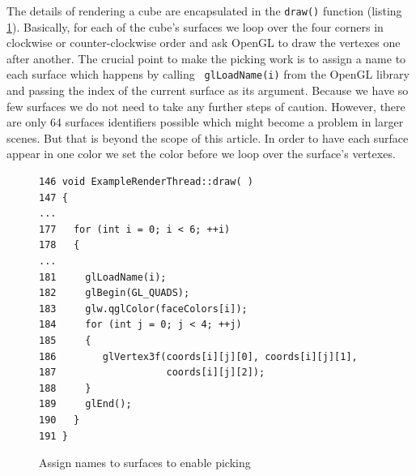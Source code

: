 \documentclass[jou,noapacite]{apa}
\begin{document}
The details of rendering a cube are encapsulated in the \lstinline|draw()|
function (listing \ref{lst:draw}).
%
Basically, for each of the cube's surfaces we loop over the four corners in
clockwise or counter-clockwise order and ask OpenGL to draw the vertexes one
after another.
%
The crucial point to make the picking work is to assign a name to each surface
which happens by calling \lstinline| glLoadName(i)| from the OpenGL library and
passing the index of the current surface as its argument.
%
Because we have so few surfaces we do not need to take any further steps of
caution.
%
However, there are only 64 surfaces identifiers possible which might become a
problem in larger scenes.
%
But that is beyond the scope of this article.
%
In order to have each surface appear in one color we set the color before we
loop over the surface's vertexes.
\begin{figure}[h]
\begin{lstlisting}[basicstyle=\scriptsize]
146 void ExampleRenderThread::draw( )
147 {
...
177   for (int i = 0; i < 6; ++i)
178   {
...
181     glLoadName(i);
182     glBegin(GL_QUADS);
183     glw.qglColor(faceColors[i]);
184     for (int j = 0; j < 4; ++j)
185     {
186        glVertex3f(coords[i][j][0], coords[i][j][1],
187                   coords[i][j][2]);
188     }
189     glEnd();
190   }
191 }
\end{lstlisting}
\caption{Assign names to surfaces to enable picking}
\label{lst:draw}
\end{figure}
\end{document}
